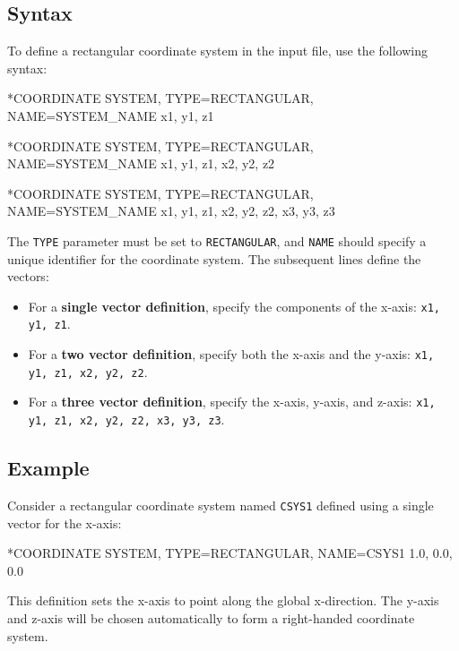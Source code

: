 \subsection{Syntax}

To define a rectangular coordinate system in the input file, use the following syntax:

\begin{codeBlock}
*COORDINATE SYSTEM, TYPE=RECTANGULAR, NAME=SYSTEM_NAME
x1, y1, z1
\end{codeBlock}

\begin{codeBlock}
*COORDINATE SYSTEM, TYPE=RECTANGULAR, NAME=SYSTEM_NAME
x1, y1, z1, x2, y2, z2
\end{codeBlock}

\begin{codeBlock}
*COORDINATE SYSTEM, TYPE=RECTANGULAR, NAME=SYSTEM_NAME
x1, y1, z1, x2, y2, z2, x3, y3, z3
\end{codeBlock}

The \texttt{TYPE} parameter must be set to \texttt{RECTANGULAR}, and \texttt{NAME} should specify a unique identifier for the coordinate system. The subsequent lines define the vectors:

\begin{itemize}
    \item For a \textbf{single vector definition}, specify the components of the x-axis: \texttt{x1, y1, z1}.
    \item For a \textbf{two vector definition}, specify both the x-axis and the y-axis: \texttt{x1, y1, z1, x2, y2, z2}.
    \item For a \textbf{three vector definition}, specify the x-axis, y-axis, and z-axis: \texttt{x1, y1, z1, x2, y2, z2, x3, y3, z3}.
\end{itemize}

\subsection{Example}

Consider a rectangular coordinate system named \texttt{CSYS1} defined using a single vector for the x-axis:

\begin{codeBlock}
*COORDINATE SYSTEM, TYPE=RECTANGULAR, NAME=CSYS1
1.0, 0.0, 0.0
\end{codeBlock}

This definition sets the x-axis to point along the global x-direction. The y-axis and z-axis will be chosen automatically to form a right-handed coordinate system.

